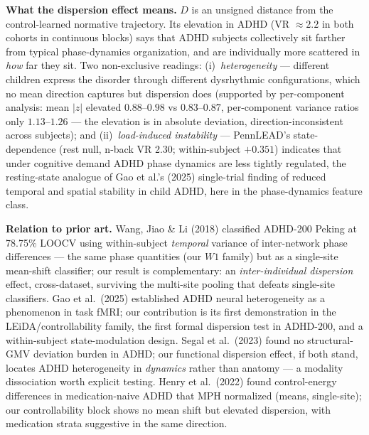 \documentclass{article}
\begin{document}
\textbf{What the dispersion effect means.} $D$ is an unsigned distance from the control-learned normative trajectory. Its elevation in ADHD (VR $\approx 2.2$ in both cohorts in continuous blocks) says that ADHD subjects collectively sit farther from typical phase-dynamics organization, and are individually more scattered in \emph{how} far they sit. Two non-exclusive readings: (i)~\emph{heterogeneity} --- different children express the disorder through different dysrhythmic configurations, which no mean direction captures but dispersion does (supported by per-component analysis: mean $|z|$ elevated $0.88$--$0.98$ vs $0.83$--$0.87$, per-component variance ratios only $1.13$--$1.26$ --- the elevation is in absolute deviation, direction-inconsistent across subjects); and (ii)~\emph{load-induced instability} --- PennLEAD's state-dependence (rest null, n-back VR 2.30; within-subject $+0.351$) indicates that under cognitive demand ADHD phase dynamics are less tightly regulated, the resting-state analogue of Gao et al.'s (2025) single-trial finding of reduced temporal and spatial stability in child ADHD, here in the phase-dynamics feature class.

\textbf{Relation to prior art.} Wang, Jiao \& Li (2018) classified ADHD-200 Peking at 78.75\% LOOCV using within-subject \emph{temporal} variance of inter-network phase differences --- the same phase quantities (our $W1$ family) but as a single-site mean-shift classifier; our result is complementary: an \emph{inter-individual dispersion} effect, cross-dataset, surviving the multi-site pooling that defeats single-site classifiers. Gao et al.\ (2025) established ADHD neural heterogeneity as a phenomenon in task fMRI; our contribution is its first demonstration in the LEiDA/controllability family, the first formal dispersion test in ADHD-200, and a within-subject state-modulation design. Segal et al.\ (2023) found no structural-GMV deviation burden in ADHD; our functional dispersion effect, if both stand, locates ADHD heterogeneity in \emph{dynamics} rather than anatomy --- a modality dissociation worth explicit testing. Henry et al.\ (2022) found control-energy differences in medication-naive ADHD that MPH normalized (means, single-site); our controllability block shows no mean shift but elevated dispersion, with medication strata suggestive in the same direction.
\end{document}
